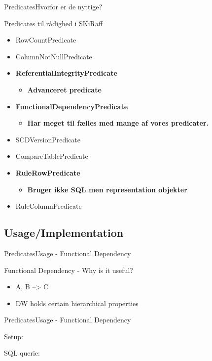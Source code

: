 \begin{frame}{Predicates}{Hvorfor er de nyttige?}
	\begin{block}{Predicates til rådighed i SKiRaff}
		\begin{itemize}
			\item<1-> RowCountPredicate
			\item<1-> ColumnNotNullPredicate
			\item<1-> \textbf{ReferentialIntegrityPredicate}
			\begin{itemize}
				\item<2-> \textbf{Advanceret predicate}
			\end{itemize}
			\item<1-> \textbf{FunctionalDependencyPredicate}
			\begin{itemize}
				\item<3-> \textbf{Har meget til fælles med mange af vores predicater.}
			\end{itemize}
			\item<1-> SCDVersionPredicate
			\item<1-> CompareTablePredicate
			\item<1-> \textbf{RuleRowPredicate}
			\begin{itemize}
				\item<4-> \textbf{Bruger ikke SQL men representation objekter}
			\end{itemize}
			\item<1-> RuleColumnPredicate
		\end{itemize}
	\end{block}
\end{frame}

\subsection{Usage/Implementation }
\begin{frame}{Predicates}{Usage - Functional Dependency}
	\begin{block}{Functional Dependency - Why is it useful?}
		\begin{itemize}
			\item<1-> A, B --> C
			\item<2-> DW holds certain hierarchical properties
		\end{itemize}
	\end{block}
\end{frame}

\begin{frame}{Predicates}{Usage - Functional Dependency}
	\begin{block}{Setup:}
	\end{block}
	\begin{block}{SQL querie:}
	\end{block}
\end{frame}

